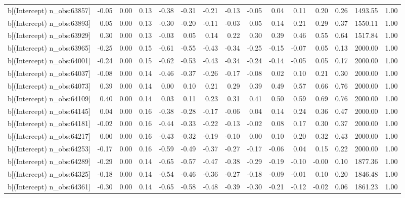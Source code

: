 \begin{table}[ht]
\begin{tabular}{rrrrrrrrrrrrrrr}
  b[(Intercept) n\_obs:63857] & -0.05 & 0.00 & 0.13 & -0.38 & -0.31 & -0.21 & -0.13 & -0.05 & 0.04 & 0.11 & 0.20 & 0.26 & 1493.55 & 1.00 \\ 
  b[(Intercept) n\_obs:63893] & 0.05 & 0.00 & 0.13 & -0.30 & -0.20 & -0.11 & -0.03 & 0.05 & 0.14 & 0.21 & 0.29 & 0.37 & 1550.11 & 1.00 \\ 
  b[(Intercept) n\_obs:63929] & 0.30 & 0.00 & 0.13 & -0.03 & 0.05 & 0.14 & 0.22 & 0.30 & 0.39 & 0.46 & 0.55 & 0.64 & 1517.84 & 1.00 \\ 
  b[(Intercept) n\_obs:63965] & -0.25 & 0.00 & 0.15 & -0.61 & -0.55 & -0.43 & -0.34 & -0.25 & -0.15 & -0.07 & 0.05 & 0.13 & 2000.00 & 1.00 \\ 
  b[(Intercept) n\_obs:64001] & -0.24 & 0.00 & 0.15 & -0.62 & -0.53 & -0.43 & -0.34 & -0.24 & -0.14 & -0.05 & 0.05 & 0.17 & 2000.00 & 1.00 \\ 
  b[(Intercept) n\_obs:64037] & -0.08 & 0.00 & 0.14 & -0.46 & -0.37 & -0.26 & -0.17 & -0.08 & 0.02 & 0.10 & 0.21 & 0.30 & 2000.00 & 1.00 \\ 
  b[(Intercept) n\_obs:64073] & 0.39 & 0.00 & 0.14 & 0.00 & 0.10 & 0.21 & 0.29 & 0.39 & 0.49 & 0.57 & 0.66 & 0.76 & 2000.00 & 1.00 \\ 
  b[(Intercept) n\_obs:64109] & 0.40 & 0.00 & 0.14 & 0.03 & 0.11 & 0.23 & 0.31 & 0.41 & 0.50 & 0.59 & 0.69 & 0.76 & 2000.00 & 1.00 \\ 
  b[(Intercept) n\_obs:64145] & 0.04 & 0.00 & 0.16 & -0.38 & -0.28 & -0.17 & -0.06 & 0.04 & 0.14 & 0.24 & 0.36 & 0.47 & 2000.00 & 1.00 \\ 
  b[(Intercept) n\_obs:64181] & -0.02 & 0.00 & 0.16 & -0.44 & -0.33 & -0.22 & -0.13 & -0.02 & 0.08 & 0.17 & 0.30 & 0.37 & 2000.00 & 1.00 \\ 
  b[(Intercept) n\_obs:64217] & 0.00 & 0.00 & 0.16 & -0.43 & -0.32 & -0.19 & -0.10 & 0.00 & 0.10 & 0.20 & 0.32 & 0.43 & 2000.00 & 1.00 \\ 
  b[(Intercept) n\_obs:64253] & -0.17 & 0.00 & 0.16 & -0.59 & -0.49 & -0.37 & -0.27 & -0.17 & -0.06 & 0.04 & 0.15 & 0.22 & 2000.00 & 1.00 \\ 
  b[(Intercept) n\_obs:64289] & -0.29 & 0.00 & 0.14 & -0.65 & -0.57 & -0.47 & -0.38 & -0.29 & -0.19 & -0.10 & -0.00 & 0.10 & 1877.36 & 1.00 \\ 
  b[(Intercept) n\_obs:64325] & -0.18 & 0.00 & 0.14 & -0.54 & -0.46 & -0.36 & -0.27 & -0.18 & -0.09 & -0.01 & 0.10 & 0.20 & 1846.48 & 1.00 \\ 
  b[(Intercept) n\_obs:64361] & -0.30 & 0.00 & 0.14 & -0.65 & -0.58 & -0.48 & -0.39 & -0.30 & -0.21 & -0.12 & -0.02 & 0.06 & 1861.23 & 1.00 \\ 

\end{tabular}
\end{table}
